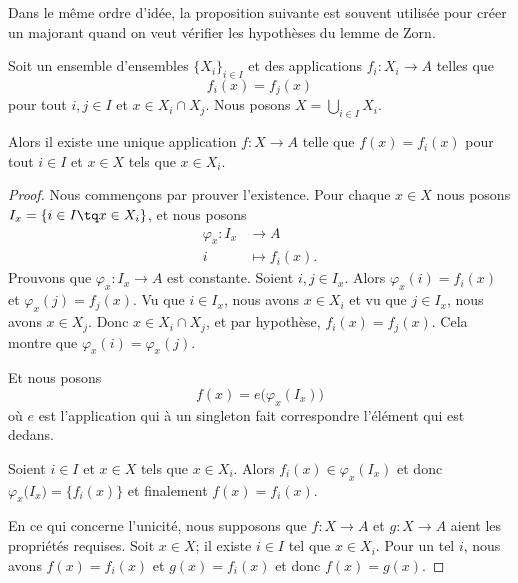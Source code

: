 Dans le même ordre d'idée, la proposition suivante est souvent utilisée pour créer un majorant quand on veut vérifier les hypothèses du lemme de Zorn.

\begin{proposition}	\label{PROPooKXBGooJYUbtF}
	Soit un ensemble d'ensembles \( \{ X_i \}_{i\in I}\) et des applications \(f_i \colon X_i\to A  \) telles que
	\begin{equation}
		f_i(x)=f_j(x)
	\end{equation}
	pour tout \( i,j\in I\) et \( x\in X_i\cap X_j\). Nous posons \( X=\bigcup_{i\in I}X_i\).

	Alors il existe une unique application \(f \colon X\to A  \) telle que \( f(x)=f_i(x)\) pour tout \( i\in I\) et \( x\in X\) tels que \( x\in X_i\).
\end{proposition}

\begin{proof}
	Nous commençons par prouver l'existence. Pour chaque \( x\in X\) nous posons \( I_x=\{ i\in I\tq x\in X_i \}\), et nous posons
	\begin{equation}
		\begin{aligned}
			\varphi_x\colon I_x & \to A           \\
			i                   & \mapsto f_i(x).
		\end{aligned}
	\end{equation}
	Prouvons que \(\varphi_x \colon I_x\to A  \) est constante. Soient \( i,j\in I_x\). Alors \( \varphi_x(i)=f_i(x)\) et \( \varphi_x(j)=f_j(x)\). Vu que \( i\in I_x\), nous avons \( x\in X_i\) et vu que \( j\in I_x\), nous avons \( x\in X_j\). Donc \( x\in X_i\cap X_j\), et par hypothèse, \( f_i(x)=f_j(x)\). Cela montre que \( \varphi_x(i)=\varphi_x(j)\).

	Et nous posons
	\begin{equation}
		f(x)=e\big( \varphi_x(I_x) \big)
	\end{equation}
	où \( e\) est l'application qui à un singleton fait correspondre l'élément qui est dedans.

	Soient \( i\in I\) et \( x\in X\) tels que \( x\in X_i\). Alors \( f_i(x)\in \varphi_x(I_x)\) et donc
	\( \varphi_x\big( I_x \big)=\{ f_i(x) \}\) et finalement \( f(x)=f_i(x)\).

	En ce qui concerne l'unicité, nous supposons que \(f \colon X\to A  \) et \(g \colon X\to A  \) aient les propriétés requises. Soit \( x\in X\); il existe \( i\in I\) tel que \( x\in X_i\). Pour un tel \( i\), nous avons \( f(x)=f_i(x)\) et \( g(x)=f_i(x)\) et donc \( f(x)=g(x)\).
\end{proof}

